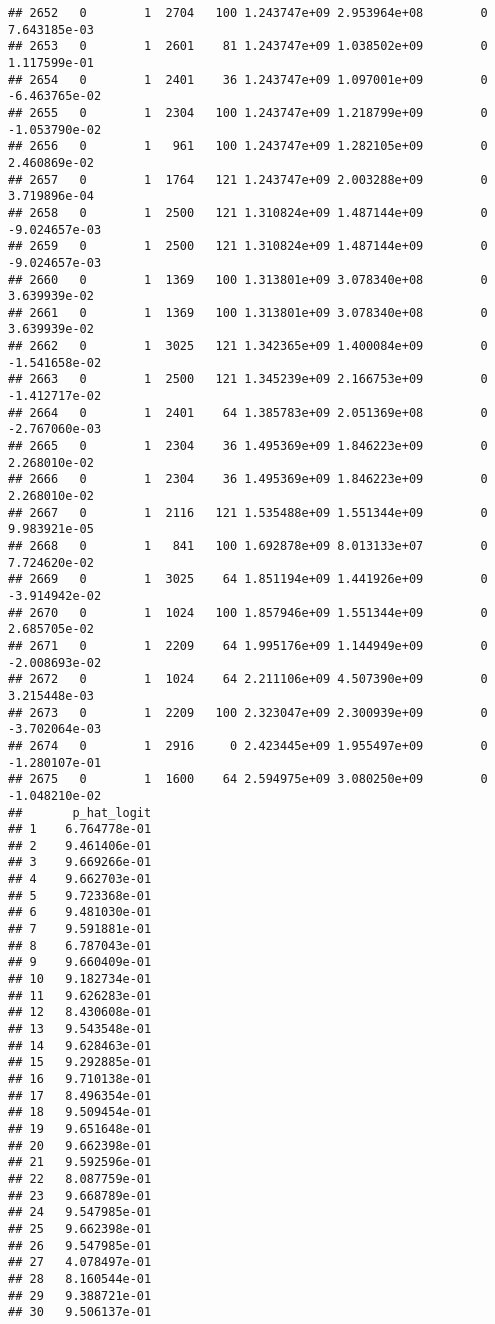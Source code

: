 \documentclass[
]{article}
\begin{document}
\begin{enumerate}
\begin{verbatim}
## 2652   0        1  2704   100 1.243747e+09 2.953964e+08        0  7.643185e-03
## 2653   0        1  2601    81 1.243747e+09 1.038502e+09        0  1.117599e-01
## 2654   0        1  2401    36 1.243747e+09 1.097001e+09        0 -6.463765e-02
## 2655   0        1  2304   100 1.243747e+09 1.218799e+09        0 -1.053790e-02
## 2656   0        1   961   100 1.243747e+09 1.282105e+09        0  2.460869e-02
## 2657   0        1  1764   121 1.243747e+09 2.003288e+09        0  3.719896e-04
## 2658   0        1  2500   121 1.310824e+09 1.487144e+09        0 -9.024657e-03
## 2659   0        1  2500   121 1.310824e+09 1.487144e+09        0 -9.024657e-03
## 2660   0        1  1369   100 1.313801e+09 3.078340e+08        0  3.639939e-02
## 2661   0        1  1369   100 1.313801e+09 3.078340e+08        0  3.639939e-02
## 2662   0        1  3025   121 1.342365e+09 1.400084e+09        0 -1.541658e-02
## 2663   0        1  2500   121 1.345239e+09 2.166753e+09        0 -1.412717e-02
## 2664   0        1  2401    64 1.385783e+09 2.051369e+08        0 -2.767060e-03
## 2665   0        1  2304    36 1.495369e+09 1.846223e+09        0  2.268010e-02
## 2666   0        1  2304    36 1.495369e+09 1.846223e+09        0  2.268010e-02
## 2667   0        1  2116   121 1.535488e+09 1.551344e+09        0  9.983921e-05
## 2668   0        1   841   100 1.692878e+09 8.013133e+07        0  7.724620e-02
## 2669   0        1  3025    64 1.851194e+09 1.441926e+09        0 -3.914942e-02
## 2670   0        1  1024   100 1.857946e+09 1.551344e+09        0  2.685705e-02
## 2671   0        1  2209    64 1.995176e+09 1.144949e+09        0 -2.008693e-02
## 2672   0        1  1024    64 2.211106e+09 4.507390e+09        0  3.215448e-03
## 2673   0        1  2209   100 2.323047e+09 2.300939e+09        0 -3.702064e-03
## 2674   0        1  2916     0 2.423445e+09 1.955497e+09        0 -1.280107e-01
## 2675   0        1  1600    64 2.594975e+09 3.080250e+09        0 -1.048210e-02
##       p_hat_logit
## 1    6.764778e-01
## 2    9.461406e-01
## 3    9.669266e-01
## 4    9.662703e-01
## 5    9.723368e-01
## 6    9.481030e-01
## 7    9.591881e-01
## 8    6.787043e-01
## 9    9.660409e-01
## 10   9.182734e-01
## 11   9.626283e-01
## 12   8.430608e-01
## 13   9.543548e-01
## 14   9.628463e-01
## 15   9.292885e-01
## 16   9.710138e-01
## 17   8.496354e-01
## 18   9.509454e-01
## 19   9.651648e-01
## 20   9.662398e-01
## 21   9.592596e-01
## 22   8.087759e-01
## 23   9.668789e-01
## 24   9.547985e-01
## 25   9.662398e-01
## 26   9.547985e-01
## 27   4.078497e-01
## 28   8.160544e-01
## 29   9.388721e-01
## 30   9.506137e-01

\end{verbatim}
\end{enumerate}
\end{document}
